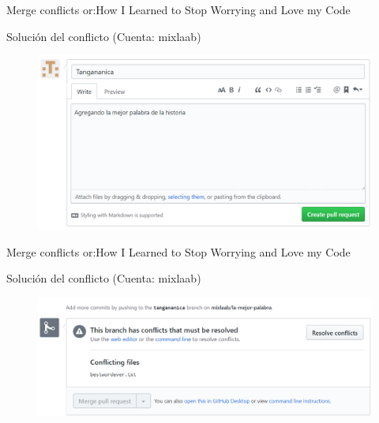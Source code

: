 \documentclass[10pt]{beamer}
\begin{document}
\begin{frame}{Merge conflicts or:}{How I Learned to Stop Worrying and Love my Code \heartsuit}

\begin{block}{Solución del conflicto (Cuenta: mixlaab)}

\begin{figure}[h!]
\centering
\includegraphics [scale=0.25]{conflict2}
\label{fig:issues}
\end{figure}
    
\end{block}

\end{frame}

\begin{frame}{Merge conflicts or:}{How I Learned to Stop Worrying and Love my Code \heartsuit}

\begin{block}{Solución del conflicto (Cuenta: mixlaab)}

\begin{figure}[h!]
\centering
\includegraphics [scale=0.25]{conflict3}
\label{fig:issues}
\end{figure}
    
\end{block}

\end{frame}
\end{document}
